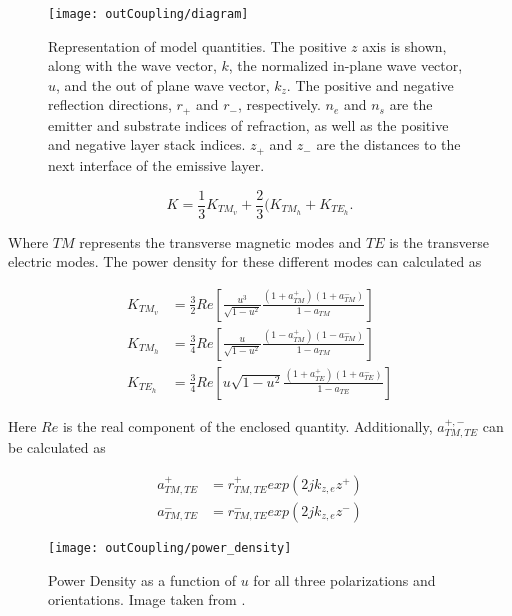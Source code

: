 \documentclass[../thesis.tex]{subfiles}
\begin{document}
\begin{figure}[ht]
\centering
\texttt{[image: outCoupling/diagram]}
\caption{Representation of model quantities.  The positive $z$ axis is shown, along with the wave vector, $k$, the normalized in-plane wave vector, $u$, and the out of plane wave vector, $k_z$.  The positive and negative reflection directions, $r_+$ and $r_-$, respectively.  $n_e$ and $n_s$ are the emitter and substrate indices of refraction, as well as the positive and negative layer stack indices.  $z_+$ and $z_-$ are the distances to the next interface of the emissive layer.}
\label{fig:out_diagram}
\end{figure}

\begin{equation}
K=\frac{1}{3}K_{TM_v}+\frac{2}{3}(K_{TM_h}+K_{TE_h}.
\end{equation}

Where $TM$ represents the transverse magnetic modes and $TE$ is the transverse electric modes.
The power density for these different modes can calculated as

\begin{eqnarray}
K_{TM_v}&=\frac{3}{2}Re\left[\frac{u^3}{\sqrt{1-u^2}}\frac{(1+a_{TM}^+)(1+a_{TM}^-)}{1-a_{TM}}\right] \\
K_{TM_h}&=\frac{3}{4}Re\left[\frac{u}{\sqrt{1-u^2}}\frac{(1-a_{TM}^+)(1-a_{TM}^-)}{1-a_{TM}}\right] \\
K_{TE_h}&=\frac{3}{4}Re\left[u\sqrt{1-u^2}\frac{(1+a_{TE}^+)(1+a_{TE}^-)}{1-a_{TE}}\right] 
\end{eqnarray}

Here $Re$ is the real component of the enclosed quantity. 
Additionally, $a_{TM,TE}^{+,-}$ can be calculated as 

\begin{eqnarray}
a_{TM,TE}^+ &= r_{TM,TE}^+ exp(2jk_{z,e}z^+) \\
a_{TM,TE}^- &= r_{TM,TE}^- exp(2jk_{z,e}z^-)
\end{eqnarray}

\begin{figure}[ht]
\centering
\texttt{[image: outCoupling/power\_density]}
\caption{Power Density as a function of $u$ for all three polarizations and orientations. Image taken from \textcite{Furno2010}.}
\label{fig:out_power_density}
\end{figure}
\end{document}
